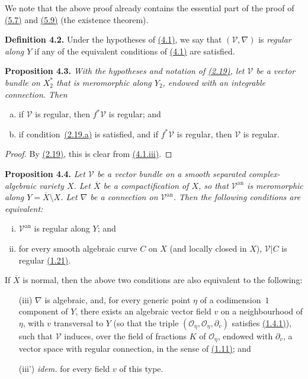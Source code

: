 \documentclass{report}
\newenvironment{itenv}[1]
  {\phantomsection\par\medskip\noindent\textbf{#1.}\itshape}
  {\par\medskip}
\newenvironment{rmenv}[1]
  {\phantomsection\par\medskip\noindent\textbf{#1.}\rmfamily}
  {\par\medskip}
\renewcommand{\cal}[1]{{\mathcal{#1}}}
\newcommand{\an}{\mathrm{an}}
\newcommand{\oldpage}[1]{\marginpar{\footnotesize$\Big\vert$ \textit{p.~#1}}}
\begin{document}
We note that the above proof already contains the essential part of the proof of \hyperref[II.5.7]{(5.7)} and \hyperref[II.5.9]{(5.9)} (the existence theorem).

\oldpage{89}
\begin{rmenv}{Definition 4.2}
\label{II.4.2}
  Under the hypotheses of \hyperref[II.4.1]{(4.1)}, we say that $(\cal{V},\nabla)$ is \emph{regular along $Y$} if any of the equivalent conditions of \hyperref[II.4.1]{(4.1)} are satisfied.
\end{rmenv}

\begin{itenv}{Proposition 4.3}
\label{II.4.3}
  With the hypotheses and notation of \hyperref[II.2.19]{(2.19)}, let $\cal{V}$ be a vector bundle on $X_2^*$ that is meromorphic along $Y_2$, endowed with an integrable connection.
  Then
  \begin{enumerate}[(a)]
    \item if $\cal{V}$ is regular, then $f^*\cal{V}$ is regular; and
    \item if condition~\hyperref[II.2.19]{(2.19.a)} is satisfied, and if $f^*\cal{V}$ is regular, then $\cal{V}$ is regular.
  \end{enumerate}
\end{itenv}

\begin{proof}
  By \hyperref[II.2.19]{(2.19)}, this is clear from \hyperref[II.4.1]{(4.1.iii)}.
\end{proof}

\begin{itenv}{Proposition 4.4}
\label{II.4.4}
  Let $\cal{V}$ be a vector bundle on a smooth separated complex-algebraic variety $X$.
  Let $\overline{X}$ be a compactification of $X$, so that $\cal{V}^\an$ is meromorphic along $Y=\overline{X}\setminus X$.
  Let $\nabla$ be a connection on $\cal{V}^\an$.
  Then the following conditions are equivalent:
  \begin{enumerate}[(i)]
    \item $\cal{V}^\an$ is regular along $Y$; and
    \item for every smooth algebraic curve $C$ on $X$ (and locally closed in $X$), $\cal{V}|C$ is regular \hyperref[II.1.21]{(1.21)}.
  \end{enumerate}

  If $\overline{X}$ is normal, then the above two conditions are also equivalent to the following:
  \begin{enumerate}
    \item[(iii)] $\nabla$ is algebraic, and, for every generic point $\eta$ of a codimension~$1$ component of $Y$, there exists an algebraic vector field $v$ on a neighbourhood of $\eta$, with $v$ transversal to $Y$ (so that the triple $(\cal{O}_\eta,\cal{O}_\eta,\partial_v)$ satisfies \hyperref[II.1.4.1]{(1.4.1)}), such that
\oldpage{90}
    $\cal{V}$ induces, over the field of fractions $K$ of $\cal{O}_\eta$, endowed with $\partial_v$, a vector space with regular connection, in the sense of \hyperref[II.1.11]{(1.11)}; and
    \item[(iii')] \emph{idem.} for every field $v$ of this type.
  \end{enumerate}
\end{itenv}
\end{document}
